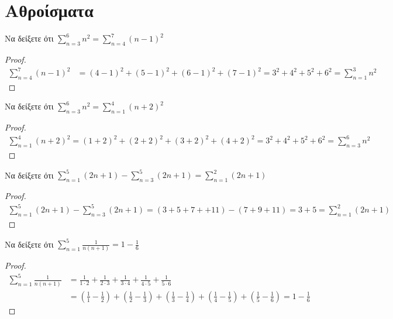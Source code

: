 \documentclass[main.tex]{subfiles}
\begin{document}
\section{Αθροίσματα}


\begin{example}
    Να δείξετε ότι $ \sum_{n=3}^{6} n^{2} = \sum_{n=4}^{7} (n-1)^{2}   $
\end{example}

\begin{proof}
    \begin{align*}
        \sum_{n=4}^{7} (n-1)^{2} &= (4-1)^{2}+(5-1)^{2}+(6-1)^{2}+(7-1)^{2} 
        = 3^{2}+4^{2}+5^{2}+6^{2} = \sum_{n=1}^{3} n^{2} 
    \end{align*}
\end{proof}

\begin{example}
    Να δείξετε ότι $ \sum_{n=3}^{6} n^{2} = \sum_{n=1}^{4} (n+2)^{2}   $
\end{example}

\begin{proof}
    \begin{align*}
        \sum_{n=1}^{4} (n+2)^{2} = (1+2)^{2}+(2+2)^{2}+(3+2)^{2}+(4+2)^{2}=
        3^{2}+4^{2}+5^{2}+6^{2} = \sum_{n=3}^{6} n^{2} 
    \end{align*}
\end{proof}

\begin{example}
    Να δείξετε ότι $ \sum_{n=1}^{5} (2n+1) - \sum_{n=3}^{5} (2n+1)  =  
    \sum_{n=1}^{2} (2n+1) $
\end{example}

\begin{proof}
    \begin{align*}
        \sum_{n=1}^{5} (2n+1)- \sum_{n=3}^{5} (2n+1) = 
        (3+5+7++11) - (7+9+11) = 3 + 5 = \sum_{n=1}^{2} (2n+1) 
    \end{align*}
\end{proof}

\begin{example}
    Να δείξετε ότι $ \sum_{n=1}^{5} \frac{1}{n(n+1)} = 1 - \frac{1}{6}  $
\end{example}

\begin{proof}
    \begin{align*}
        \sum_{n=1}^{5} \frac{1}{n(n+1)} 
        &= \frac{1}{1\cdot 2} + \frac{1}{2 \cdot 3} + \frac{1}{3 \cdot 4} 
        + \frac{1}{4 \cdot 5} + \frac{1}{5 \cdot 6} \\
        &= \left(\frac{1}{1} - \frac{1}{2}\right) + \left(\frac{1}{2} 
        - \frac{1}{3} \right) + \left(\frac{1}{3} - \frac{1}{4}\right) 
        + \left(\frac{1}{4} - \frac{1}{5}\right) +
        \left(\frac{1}{5} - \frac{1}{6}\right)  = 1 - \frac{1}{6}
    \end{align*}
\end{proof}
\end{document}
